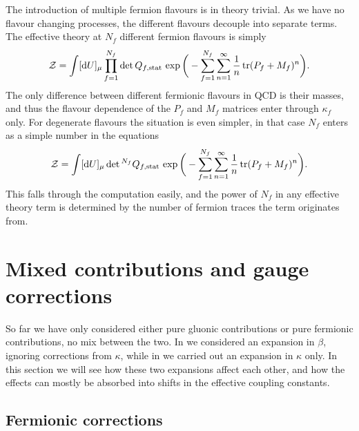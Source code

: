 The introduction of multiple fermion flavours is in theory trivial. As we have
no flavour changing processes, the different flavours decouple into separate
terms. The effective theory at $N_f$ different fermion flavours is simply
%
\begin{equation}
  \mathcal{Z} = \int [\mathrm{d} U]_{\mu} \prod_{f=1}^{N_f} \det
  Q_{f,\mathrm{stat}} \, \exp \bigg( -\sum_{f=1}^{N_f} \sum_{n=1}^{\infty}
  \frac{1}{n} \operatorname{tr} (P_f + M_f)^n \bigg).
\end{equation}
%
The only difference between different fermionic flavours in QCD is their masses,
and thus the flavour dependence of the $P_f$ and $M_f$ matrices enter through
$\kappa_f$ only. For degenerate flavours the situation is even simpler, in that
case $N_f$ enters as a simple number in the equations
%
\begin{equation}
  \mathcal{Z} = \int [\mathrm{d} U]_{\mu}  \det{}^{N_f} Q_{f,\mathrm{stat}} \,
  \exp \bigg( -\sum_{f=1}^{N_f} \sum_{n=1}^{\infty}
  \frac{1}{n} \operatorname{tr} (P_f + M_f)^n \bigg).
\end{equation}
%
This falls through the computation easily, and the power of $N_f$ in any
effective theory term is determined by the number of fermion traces the term
originates from.

\section{Mixed contributions and gauge corrections}

So far we have only considered either pure gluonic contributions or pure
fermionic contributions, no mix between the two. In 
we considered an expansion in $\beta$, ignoring corrections from $\kappa$, while
in  we carried out an expansion in $\kappa$
only. In this section we will see how these two expansions affect each other,
and how the effects can mostly be absorbed into shifts in the effective coupling
constants.

\subsection{Fermionic corrections}

